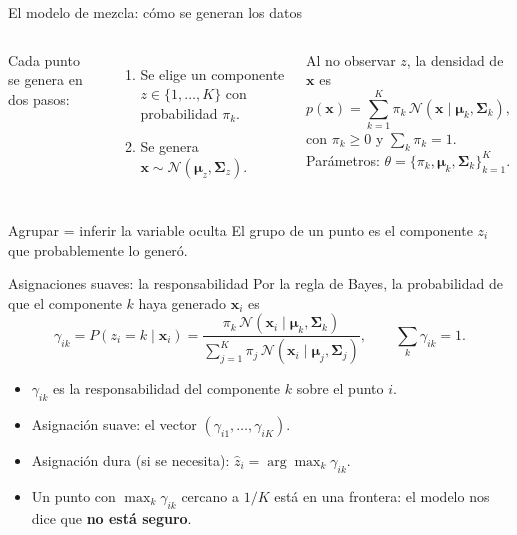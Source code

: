 \documentclass[aspectratio=169,11pt]{beamer}
\newcommand{\x}{\bm{x}}
\newcommand{\muv}{\bm{\mu}}
\newcommand{\Sig}{\bm{\Sigma}}
\newcommand{\N}{\mathcal{N}}
\begin{document}
\begin{frame}{El modelo de mezcla: cómo se generan los datos}
  \begin{columns}[c]
    Cada punto se genera en dos pasos:
    \begin{enumerate}
      \item Se elige un componente $z \in \{1,\dots,K\}$ con probabilidad $\pi_k$.
      \item Se genera $\x \sim \N(\muv_z, \Sig_z)$.
    \end{enumerate}
    \vspace{4pt}
    Al no observar $z$, la densidad de $\x$ es
    \[
      p(\x) = \sum_{k=1}^{K} \pi_k\, \N(\x \mid \muv_k, \Sig_k),
    \]
    con $\pi_k \ge 0$ y $\sum_k \pi_k = 1$.
    Parámetros: $\theta = \{\pi_k, \muv_k, \Sig_k\}_{k=1}^K$.
    \centering
  \end{columns}
  \vspace{4pt}
  \begin{block}{Agrupar = inferir la variable oculta}
    El grupo de un punto es el componente $z_i$ que probablemente lo generó.
  \end{block}
\end{frame}

\begin{frame}{Asignaciones suaves: la responsabilidad}
  Por la regla de Bayes, la probabilidad de que el componente $k$ haya generado $\x_i$ es
  \[
    \gamma_{ik} = P(z_i = k \mid \x_i)
    = \frac{\pi_k\, \N(\x_i \mid \muv_k, \Sig_k)}{\sum_{j=1}^{K} \pi_j\, \N(\x_i \mid \muv_j, \Sig_j)} ,
    \qquad \sum_k \gamma_{ik} = 1 .
  \]
  \begin{itemize}
    \item $\gamma_{ik}$ es la \alert{responsabilidad} del componente $k$ sobre el punto $i$.
    \item Asignación suave: el vector $(\gamma_{i1},\dots,\gamma_{iK})$.
    \item Asignación dura (si se necesita): $\hat z_i = \arg\max_k \gamma_{ik}$.
    \item Un punto con $\max_k \gamma_{ik}$ cercano a $1/K$ está en una frontera:
          el modelo nos dice que \textbf{no está seguro}.
  \end{itemize}
\end{frame}
\end{document}
